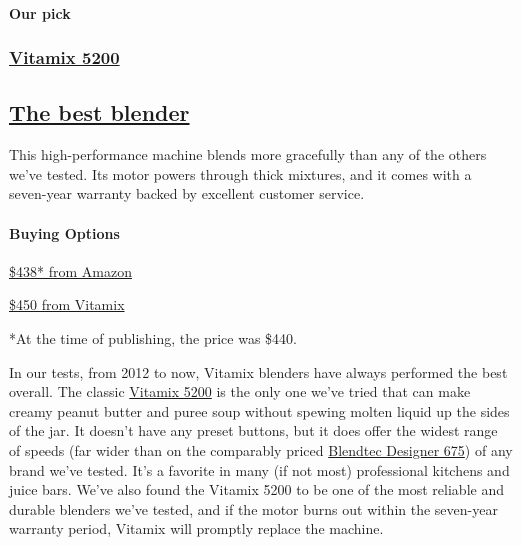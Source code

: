 \hypertarget{our-pick}{%
\paragraph{Our pick}\label{our-pick}}

\href{https://www.nytimes3xbfgragh.onion/wirecutter/out/link/7761/112178/4/109194?merchant=Amazon}{}

\hypertarget{vitamix-5200}{%
\subsubsection{\texorpdfstring{\href{https://www.nytimes3xbfgragh.onion/wirecutter/out/link/7761/112178/4/109194?merchant=Amazon}{Vitamix
5200}}{Vitamix 5200}}\label{vitamix-5200}}

\hypertarget{the-best-blender-1}{%
\subsection{\texorpdfstring{\href{https://www.nytimes3xbfgragh.onion/wirecutter/out/link/7761/112178/4/109194?merchant=Amazon}{The
best blender}}{The best blender}}\label{the-best-blender-1}}

This high-performance machine blends more gracefully than any of the
others we've tested. Its motor powers through thick mixtures, and it
comes with a seven-year warranty backed by excellent customer service.

\hypertarget{buying-options}{%
\paragraph{Buying Options}\label{buying-options}}

\href{https://www.nytimes3xbfgragh.onion/wirecutter/out/link/7761/112178/4/109194?merchant=Amazon}{\$438*
from Amazon}

\href{https://www.nytimes3xbfgragh.onion/wirecutter/out/link/7761/149373/4/109194?merchant=Vitamix}{\$450
from Vitamix}

*At the time of publishing, the price was \$440.

In our tests, from 2012 to now, Vitamix blenders have always performed
the best overall. The classic
\href{https://www.nytimes3xbfgragh.onion/wirecutter/out/link/7761/112178/4/69782/?merchant=Amazon}{Vitamix
5200} is the only one we've tried that can make creamy peanut butter and
puree soup without spewing molten liquid up the sides of the jar. It
doesn't have any preset buttons, but it does offer the widest range of
speeds (far wider than on the comparably priced
\protect\hyperlink{the-competition}{Blendtec Designer 675}) of any brand
we've tested. It's a favorite in many (if not most) professional
kitchens and juice bars. We've also found the Vitamix 5200 to be one of
the most reliable and durable blenders we've tested, and if the motor
burns out within the seven-year warranty period, Vitamix will promptly
replace the machine.

